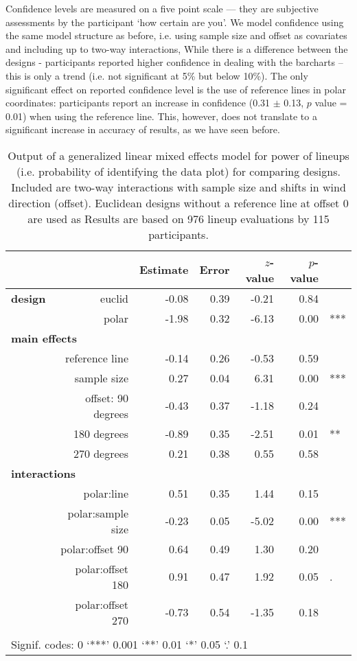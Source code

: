  Confidence levels are measured on a five point scale --- they are subjective assessments by the participant `how certain are you'. We model confidence using the same model structure as before, i.e. using sample size and offset as covariates and including up to two-way interactions,
While there is a difference between the designs - participants reported higher confidence in dealing with the barcharts -- this is only  a trend (i.e. not significant at 5\% but below 10\%). The only significant effect on reported confidence level is the use of reference lines in polar coordinates: participants report an increase in confidence (0.31 $\pm$ 0.13, $p$ value = 0.01) when using the reference line. This, however, does not translate to a significant increase in accuracy of results, as we have seen before.

\begin{table}[ht]
\begin{center}
\resizebox{\linewidth}{!} {
\begin{tabular}{rrrrrrl}
  \hline
& & Estimate & Error & $z$-value & $p$-value &\\ 
  \hline
\bf design & euclid & -0.08 & 0.39 & -0.21 & 0.84 &\\ 
&polar & -1.98 & 0.32 & -6.13 & 0.00 & ***\\ [3pt]
\multicolumn{2}{l}{\bf main effects} &&&&&\\
& reference line  & -0.14 & 0.26 & -0.53 & 0.59 & \\ [1pt]
&  sample size & 0.27 & 0.04 & 6.31 & 0.00 & ***\\[1pt]
 &offset:  90 degrees& -0.43 & 0.37 & -1.18 & 0.24 &\\ 
  & 180 degrees& -0.89 & 0.35 & -2.51 & 0.01 & **\\ 
  & 270 degrees& 0.21 & 0.38 & 0.55 & 0.58 &\\ [3pt]
\multicolumn{2}{l}{\bf interactions} &&&&&\\
&  polar:line & 0.51 & 0.35 & 1.44 & 0.15 &\\ [1pt]
&    polar:sample size & -0.23 & 0.05 & -5.02 & 0.00 & ***\\[1pt]
&    polar:offset 90 & 0.64 & 0.49 & 1.30 & 0.20 \\ 
&  polar:offset 180 & 0.91 & 0.47 & 1.92 & 0.05 & .\\ 
&    polar:offset 270 & -0.73 & 0.54 & -1.35 & 0.18 &\\
   \hline
\\[-5pt]
   \multicolumn{5}{l}{Signif. codes:  0 `***' 0.001 `**' 0.01 `*' 0.05 `.' 0.1}
\end{tabular}
}
\end{center}
\caption{\label{tbl:correct} Output of a generalized linear mixed effects model for power of lineups (i.e. probability of identifying the data plot) for comparing designs. Included are two-way interactions with sample size and shifts in wind direction (offset). Euclidean designs without a reference line at offset 0 are used as 
 Results are based on  976 lineup evaluations by 115 participants. }
\end{table}


